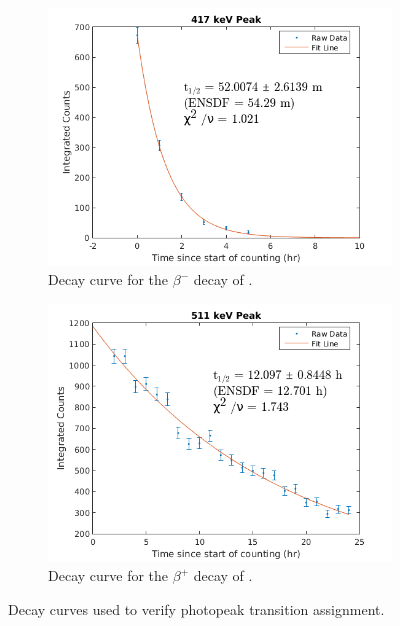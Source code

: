 \documentclass[5p]{elsarticle}
\begin{document}
\begin{figure}
\begin{subfigure}[t]{0.49\textwidth}
        \label{fig:decay_curve_391}
    \end{subfigure}%
    \\
    \begin{subfigure}[t]{0.49\textwidth}
        \centering
        \includegraphics[scale=0.6]{./figures/417keV_curve2.png}
        \caption{Decay curve for the $\beta^-$ decay of .}
                \label{fig:decay_curve_417}
    \end{subfigure}
     \begin{subfigure}[t]{0.49\textwidth}
        \centering
        \includegraphics[scale=0.6]{./figures/511keV_curve2.png}
        \caption{ Decay curve for the $\beta^+$ decay of .}
        \label{fig:decay_curve_511}
    \end{subfigure}%
    \caption{Decay curves used to verify photopeak transition assignment.}
     \label{fig:decay_curves}
\end{figure}
\end{document}
